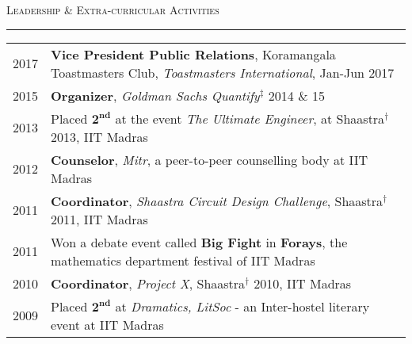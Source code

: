 \documentclass[8pt,a4paper,English]{article}
\newcommand{\lv}{\color{table-border}\vrule}
\newcommand\roottitle[1]{ \vspace{3mm} \noindent \textsc{ \large #1} \vspace{1.5mm} \nopagebreak[4] \color{gray} \hrule \color{black} \vspace{2mm} \noindent \small }
\begin{document}
\roottitle{Leadership \& Extra-curricular Activities}
\renewcommand{\arraystretch}{1.2}
\setlength\tabcolsep{8pt}
\begin{tabularx}{\textwidth}{ r !{\lv} X }

2017 & \textbf{Vice President Public Relations}, Koramangala Toastmasters Club, \textit{Toastmasters International}, Jan-Jun 2017 \\
2015 & \textbf{Organizer}, \textit{Goldman Sachs Quantify}$^\ddag$ 2014 \& 15 \\
2013 & Placed $\mathbf{2^{nd}}$ at the event \emph{The Ultimate Engineer}, at Shaastra$^\dag$ 2013, IIT Madras \\
2012 & \textbf{Counselor}, \textit{Mitr}, a peer-to-peer counselling body at IIT Madras \\
2011 & \textbf{Coordinator}, \emph{Shaastra Circuit Design Challenge}, Shaastra$^\dag$ 2011, IIT Madras \\
2011 & Won a debate event called \textbf{Big Fight} in \textbf{Forays}, the mathematics department festival of IIT Madras\\
2010 & \textbf{Coordinator}, \emph{Project X}, Shaastra$^\dag$ 2010, IIT Madras \\
2009 & Placed $\mathbf{2^{nd}}$ at \emph{Dramatics, LitSoc} - an Inter-hostel literary event at IIT Madras \\ 
\end{tabularx}

\vspace{5mm}

 \\
\end{document}
